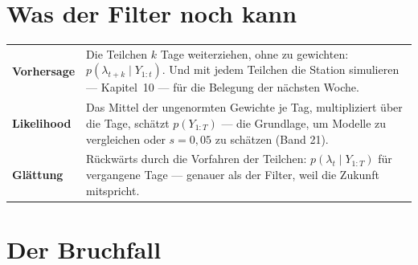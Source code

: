 \section{Was der Filter noch kann}

\begin{merksatz}
\begin{center}
{\small
\renewcommand{\arraystretch}{1.5}
\begin{tabular}{@{}P{2.8cm}P{5.8cm}@{}}
\toprule
\textbf{Vorhersage} & Die Teilchen $k$ Tage weiterziehen, ohne zu gewichten: $p(\lambda_{t+k}\mid Y_{1:t})$. Und mit jedem Teilchen die Station simulieren --- Kapitel~10 --- für die Belegung der nächsten Woche.\\
\textbf{Likelihood} & Das Mittel der ungenormten Gewichte je Tag, multipliziert über die Tage, schätzt $p(Y_{1:T})$ --- die Grundlage, um Modelle zu vergleichen oder $s = 0{,}05$ zu schätzen (Band 21).\\
\textbf{Glättung} & Rückwärts durch die Vorfahren der Teilchen: $p(\lambda_t\mid Y_{1:T})$ für vergangene Tage --- genauer als der Filter, weil die Zukunft mitspricht.\\
\bottomrule
\end{tabular}}
\end{center}

\begin{center}
\begin{minipage}{0.88\textwidth}
\end{minipage}
\end{center}
\end{merksatz}

\section{Der Bruchfall}

